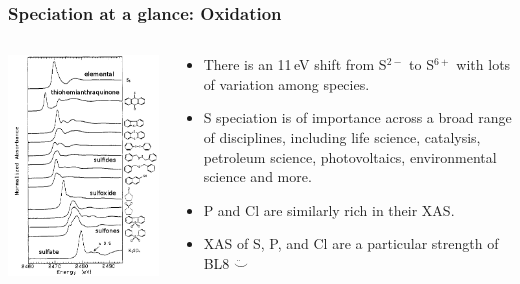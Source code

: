 \documentclass[10pt, xcolor=x11names, compress]{beamer}
\begin{document}
\begin{frame}
  \frametitle{Speciation at a glance: Oxidation}
  
  \begin{columns}
    \begin{column}{0.4\linewidth}
      \includegraphics[width=\linewidth]{images/S.png}
    \end{column}
    \begin{column}{0.6\linewidth}
      \begin{itemize}
      \item There is an 11\,eV shift from S$^{2-}$ to S$^{6+}$ with
        lots of variation among species.
      \item S speciation is of importance across a broad range of
        disciplines, including life science, catalysis, petroleum
        science, photovoltaics, environmental science and more.
      \item P and Cl are similarly rich in their XAS.
      \item XAS of S, P, and Cl are a particular strength of BL8
        $\ddot\smile$
      \end{itemize}


\end{column}
\end{columns}
\end{frame}
\end{document}
